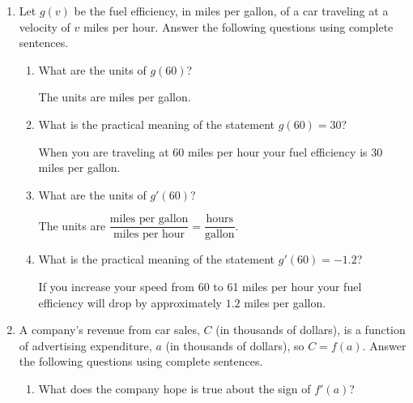 \documentclass[10pt]{article}
\begin{document}
\drawtitle
\begin{enumerate}
\item Let $g(v)$ be the fuel efficiency, in miles per gallon, of a car
  traveling at a velocity of $v$ miles per hour. Answer the following
  questions using complete sentences.
  \begin{enumerate}
  \item What are the units of $g(60)$?
    
    \vfill

    {\color{blue} The units are miles per gallon.}
    
    \vfill
    
  \item What is the practical meaning of the statement $g(60) = 30$?
    
    \vfill

    {\color{blue} When you are traveling at 60 miles per hour your
      fuel efficiency is 30 miles per gallon.}

    \vfill
    
  \item What are the units of $g'(60)$?
    
    \vfill

    {\color{blue} The units are $\dfrac{\text{miles per
          gallon}}{\text{miles per hour}} =
      \dfrac{\text{hours}}{\text{gallon}}$.}

    \vfill
    
  \item What is the practical meaning of the statement $g'(60) = -1.2$?
    
    \vfill

    {\color{blue} If you increase your speed from 60 to 61 miles per
      hour your fuel efficiency will drop by approximately $1.2$ miles
      per gallon.}

    \vfill
    
  \end{enumerate}

  \newpage

\item A company's revenue from car sales, $C$ (in thousands of
  dollars), is a function of advertising expenditure, $a$ (in
  thousands of dollars), so $C = f(a)$. Answer the following questions
  using complete sentences.
  \begin{enumerate}
  \item What does the company hope is true about the sign of $f'(a)$?
    

\end{enumerate}
\end{enumerate}
\end{document}

